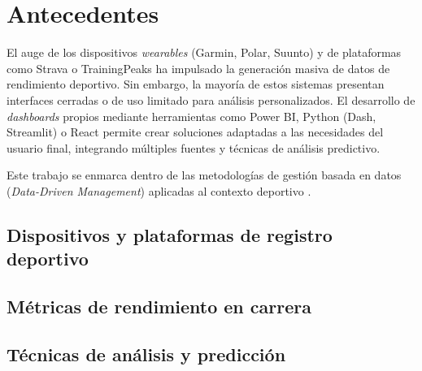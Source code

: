 \chapter{Antecedentes}
\label{ch:antecedentes}


El auge de los dispositivos \textit{wearables} (Garmin, Polar, Suunto) y de plataformas como Strava o TrainingPeaks ha impulsado la generación masiva de datos de rendimiento deportivo. Sin embargo, la mayoría de estos sistemas presentan interfaces cerradas o de uso limitado para análisis personalizados. El desarrollo de \textit{dashboards} propios mediante herramientas como Power BI, Python (Dash, Streamlit) o React permite crear soluciones adaptadas a las necesidades del usuario final, integrando múltiples fuentes y técnicas de análisis predictivo.

Este trabajo se enmarca dentro de las metodologías de gestión basada en datos (\textit{Data-Driven Management}) aplicadas al contexto deportivo \cite{davenport2010analytics, marr2016big}.

\section{Dispositivos y plataformas de registro deportivo}
\label{sec:plataformas}

\section{Métricas de rendimiento en carrera}
\label{sec:metricas}

\section{Técnicas de análisis y predicción}
\label{sec:tecnicas}

